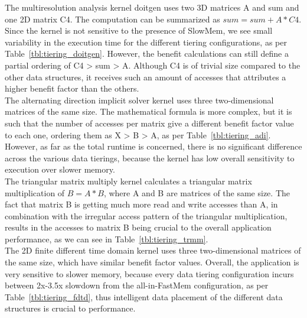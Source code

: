 
 The multiresolution analysis kernel doitgen
uses two 3D matrices {\ttfamily A} and {\ttfamily sum} and one 2D matrix {\ttfamily C4}. The computation can be summarized as $sum = sum + A*C4$. 
Since the kernel is not sensitive to the presence of SlowMem, we see small variability in the execution time for the different tiering configurations, as per Table~\ref{tbl:tiering_doitgen}. 
However, the benefit calculations can still define a partial ordering of {\ttfamily C4 > sum > A}. 
Although {\ttfamily C4} is of trivial size compared to the other data structures, it receives such an amount of accesses that attributes a higher benefit factor than the others.\\

 The alternating direction implicit solver kernel uses three two-dimensional matrices of the same size. The mathematical formula is more complex, but it is such that the number of accesses per matrix give a different benefit factor value to each one, ordering them as {\ttfamily X > B > A}, as per Table~\ref{tbl:tiering_adi}. However, as far as the total runtime is concerned, there is no significant difference across the various data tierings, because the kernel has low overall sensitivity to execution over slower memory.\\

 The triangular matrix multiply kernel calculates a triangular matrix multiplication of $B = A*B$, where {\ttfamily A} and {\ttfamily B} are matrices of the same size. The fact that matrix {\ttfamily B} is getting much more read and write accesses than {\ttfamily A}, in combination with 
the irregular access pattern of the triangular multiplication, results in the accesses to matrix {\ttfamily B} being crucial to the overall application performance, as we can see in Table~\ref{tbl:tiering_trmm}. \\

 The 2D finite different time domain kernel uses three two-dimensional matrices of the same size, which have similar benefit factor values. Overall, the application is very sensitive to slower memory, because every data tiering configuration incurs between 2x-3.5x slowdown from the all-in-FastMem configuration, as per Table~\ref{tbl:tiering_fdtd}, thus intelligent data placement of the different data structures is crucial to performance.\\

